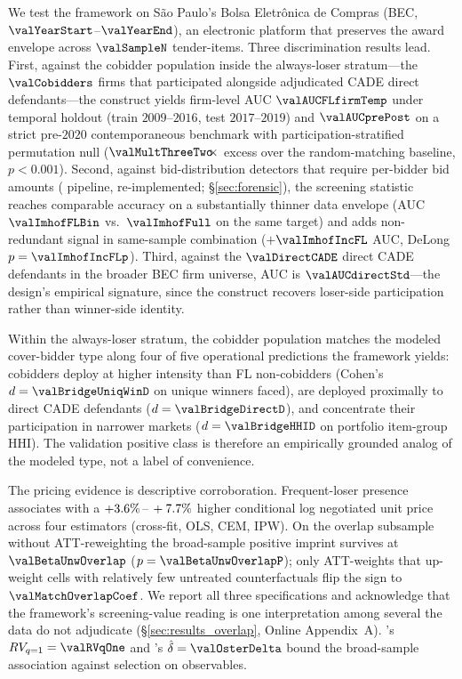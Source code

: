 We test the framework on São Paulo's Bolsa Eletr\^onica de
Compras (BEC, $\valYearStart$--$\valYearEnd$), an electronic
platform that preserves the award envelope across
$\valSampleN$ tender-items. Three discrimination results lead.
First, against the cobidder population inside the always-loser
stratum---the $\valCobidders$ firms that participated alongside
adjudicated CADE direct defendants---the construct yields
firm-level AUC $\valAUCFLfirmTemp$ under temporal holdout
(train $2009$--$2016$, test $2017$--$2019$) and
$\valAUCprePost$ on a strict pre-$2020$ contemporaneous benchmark
with participation-stratified permutation null
($\valMultThreeTwo\!\!\times$ excess over the random-matching
baseline, $p<0.001$).
Second, against bid-distribution detectors that require
per-bidder bid amounts (\citealt{imhof2019detecting} pipeline,
re-implemented; \S\ref{sec:forensic}), the screening statistic
reaches comparable accuracy on a substantially thinner data
envelope (AUC $\valImhofFLBin$ vs.\ $\valImhofFull$ on the same target) and adds
non-redundant signal in same-sample combination
($+\valImhofIncFL$ AUC, DeLong $p=\valImhofIncFLp$). Third,
against the $\valDirectCADE$ direct CADE defendants in the
broader BEC firm universe, AUC is $\valAUCdirectStd$---the
design's empirical signature, since the construct recovers
loser-side participation rather than winner-side identity.

Within the always-loser stratum, the cobidder population matches
the modeled cover-bidder type along four of five operational
predictions the framework yields: cobidders deploy at higher
intensity than FL non-cobidders (Cohen's $d=\valBridgeUniqWinD$ on unique
winners faced), are deployed proximally to direct CADE defendants
($d=\valBridgeDirectD$), and concentrate their participation in narrower
markets ($d=\valBridgeHHID$ on portfolio item-group HHI). The validation
positive class is therefore an empirically grounded analog of the
modeled type, not a label of convenience.

The pricing evidence is descriptive corroboration. Frequent-loser
presence associates with a $+3.6\%\,\text{--}\,+7.7\%$ higher conditional
log negotiated unit price across four estimators (cross-fit, OLS,
CEM, IPW). On the overlap subsample without ATT-reweighting the
broad-sample positive imprint survives at
$\valBetaUnwOverlap$ ($p=\valBetaUnwOverlapP$); only ATT-weights
that up-weight cells with relatively few untreated counterfactuals
flip the sign to $\valMatchOverlapCoef$. We report all three
specifications and acknowledge that the framework's
screening-value reading is one interpretation among several the
data do not adjudicate
(\S\ref{sec:results_overlap}, Online Appendix~A).
\citet{cinelli2020making}'s $RV_{q=1}=\valRVqOne$ and
\citet{oster2019unobservable}'s $\hat{\delta}=\valOsterDelta$
bound the broad-sample association against selection on observables.

